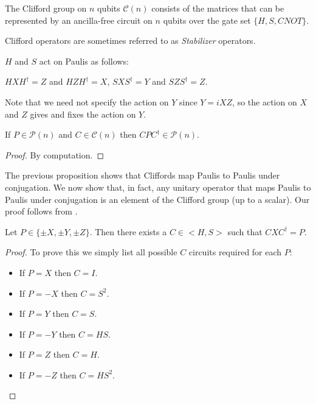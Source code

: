 \documentclass[12pt]{dalthesis}
\begin{document}
\begin{definition}
The Clifford group on $n$ qubits $\mathcal{C}(n)$ consists of the matrices that can be represented by an ancilla-free circuit on $n$ qubits over the gate set $\{H, S, CNOT\}$.
\end{definition}

Clifford operators are sometimes referred to as \emph{Stabilizer} operators.

\begin{proposition}
$H$ and $S$ act on Paulis as follows:
\begin{center}
$HXH^{\dag} = Z$ and $HZH^{\dag} = X$, $SXS^{\dag} = Y$ and $SZS^{\dag} = Z$.
\end{center}
\end{proposition}

Note that we need not specify the action on $Y$ since $Y = iXZ$, so the action on $X$ and $Z$ gives and fixes the action on $Y$.

\begin{proposition}
\label{CliffordPtoP}
If $P \in \mathcal{P}(n)$ and $C \in \mathcal{C}(n)$ then $CPC^{\dag} \in \mathcal{P}(n)$.
\end{proposition}
\begin{proof}
By computation.
\end{proof}

The previous proposition shows that Cliffords map Paulis to Paulis under conjugation. We now show that, in fact, any unitary operator that maps Paulis to Paulis under conjugation is an element of the Clifford group (up to a scalar). Our proof follows from \cite{nielsen00}.

\begin{lemma}
\label{ConjX}
Let $P \in \{\pm X, \pm Y, \pm Z \}$. Then there exists a $C \in <H, S>$ such that $CXC^\dag = P$.
\end{lemma}
\begin{proof}
To prove this we simply list all possible $C$ circuits required for each $P$:
\begin{itemize}
\item If $P = X$ then $C = I$.
\item If $P = -X$ then $C = S^2$.
\item If $P = Y$ then $C = S$.
\item If $P = -Y$ then $C = HS$.
\item If $P = Z$ then $C = H$.
\item If $P = -Z$ then $C = HS^2$.
\end{itemize}
\end{proof}
\end{document}
